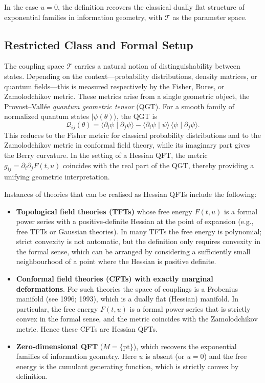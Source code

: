 \documentclass[12pt]{amsart}
\newcommand{\cT}{\mathcal{T}}
\begin{document}
In the case $u=0$, the definition recovers the classical dually flat structure of exponential families in information geometry, with $\cT$ as the parameter space.

\subsection{Restricted Class and Formal Setup}\label{sec:restricted_class}
The coupling space $\mathcal{T}$ carries a natural notion of distinguishability between states. Depending on the context—probability distributions, density matrices, or quantum fields—this is measured respectively by the Fisher, Bures, or Zamolodchikov metric. These metrics arise from a single geometric object, the Provost--Vall\'ee \emph{quantum geometric tensor} (QGT). For a smooth family of normalized quantum states $|\psi(\theta)\rangle$, the QGT is
\[
\mathscr{Q}_{ij}(\theta) 
= \langle \partial_i \psi \mid \partial_j \psi \rangle 
- \langle \partial_i \psi \mid \psi \rangle \, \langle \psi \mid \partial_j \psi \rangle.
\]
This reduces to the Fisher metric for classical probability distributions and to the Zamolodchikov metric in conformal field theory, while its imaginary part gives the Berry curvature. In the setting of a Hessian QFT, the metric $g_{ij}=\partial_i\partial_jF(t,u)$ coincides with the real part of the QGT, thereby providing a unifying geometric interpretation.


Instances of theories that can be realised as Hessian QFTs include the following:
\begin{itemize}
    \item \textbf{Topological field theories (TFTs)} whose free energy $F(t,u)$ is a formal power series with a positive‑definite Hessian at the point of expansion (e.g., free TFTs or Gaussian theories). In many TFTs the free energy is polynomial; strict convexity is not automatic, but the definition only requires convexity in the formal sense, which can be arranged by considering a sufficiently small neighbourhood of a point where the Hessian is positive definite.
    \item \textbf{Conformal field theories (CFTs) with exactly marginal deformations}. For such theories the space of couplings is a Frobenius manifold (see \cite{D} 1996; \cite{CV} 1993), which is a dually flat (Hessian) manifold. In particular, the free energy $F(t,u)$ is a formal power series that is strictly convex in the formal sense, and the metric coincides with the Zamolodchikov metric. Hence these CFTs are Hessian QFTs.
    \item \textbf{Zero‑dimensional QFT} ($M = \{\mathrm{pt}\}$), which recovers the exponential families of information geometry. Here $u$ is absent (or $u=0$) and the free energy is the cumulant generating function, which is strictly convex by definition.
\end{itemize}
\end{document}
